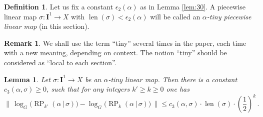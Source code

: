 \documentclass[10pt, a4paper]{amsart}
\newtheorem{lem}[equation]{Lemma}
\theoremstyle{definition}
\newtheorem{dfn}[equation]{Definition}
\newtheorem{rem}[equation]{Remark}
\numberwithin{equation}{section}
\newcommand{\opn}{\operatorname}
\newcommand{\mbf}[1]{\mathbf{#1}}
\newcommand{\smfrac}[2]{{\textstyle \frac{#1}{#2}}}
\newcommand{\Norm}[1]{\bigl\lVert\, #1 \, \bigr\rVert}
\renewcommand{\vert}{\, | \,}
\begin{document}
\begin{dfn} \label{dfn:13}
Let us fix a constant $\epsilon_2(\alpha)$ as in Lemma
\ref{lem:30}. A piecewise linear map $\sigma : \mbf{I}^1 \to X$ with 
$\opn{len}(\sigma) < \epsilon_2(\alpha)$
will be called an {\em $\alpha$-tiny piecewise linear map} (in this section).
\end{dfn}

\begin{rem}
We shall use the term ``tiny'' several times in the paper, each time with a new
meaning, depending on context. The notion ``tiny'' should be considered as
``local to each section''. 
\end{rem}

\begin{lem} \label{lem:31}
Let $\sigma : \mbf{I}^{1} \to X$ be an $\alpha$-tiny linear map. Then
there is a constant $c_3(\alpha, \sigma) \geq 0$, 
such that for any integers $k' \geq k \geq 0$ one has
\[ \Norm{ \log_G \bigl( \opn{RP}_{k'} (\alpha \vert \sigma) \bigl) - 
\log_G \bigl( \opn{RP}_{k} (\alpha \vert \sigma) \bigl) }
\leq c_3(\alpha, \sigma) \cdot \opn{len}(\sigma) \cdot (\smfrac{1}{2})^k \, .
\]
\end{lem}
\end{document}
